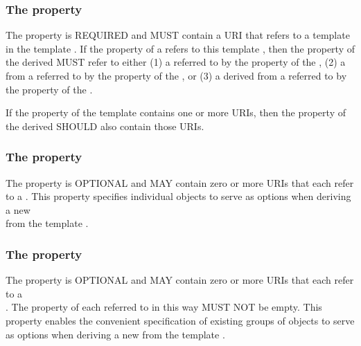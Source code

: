 \subsubsection*{ The  property}\label{sec:variable}

The  property is REQUIRED and MUST contain a URI that refers to a template  in the template . If the  property of a  refers to this template , then the  property of the derived  MUST refer to either (1) a  referred to by the  property of the , (2) a  from a  referred to by the  property of the , or (3) a  derived from a  referred to by the  property of the .

If the  property of the template  contains one or more URIs, then the  property of the derived  SHOULD also contain those URIs.

\subsubsection*{ The  property}\label{sec:variants}

The  property is OPTIONAL and MAY contain zero or more URIs that each refer to a . This property specifies individual  objects to serve as options when deriving a new\\
 from the template .

\subsubsection*{ The  property}\label{sec:variantCollections}

The  property is OPTIONAL and MAY contain zero or more URIs that each refer to a\\
. The  property of each  referred to in this way MUST NOT be empty. This property enables the convenient specification of existing groups of  objects to serve as options when deriving a new  from the template .

